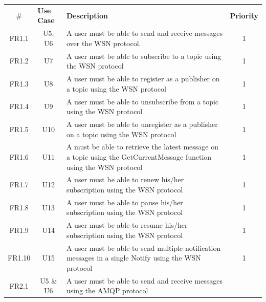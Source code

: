 \begin{longtable}{@{\extracolsep{\fill}}|l|l|p{8cm}|l|@{}}
\hline
\rowcolor{lightgray}
\multicolumn{4}{|c|}{\textbf{Functional requirements}}  \\ \hline
\multicolumn{1}{|c|}{\textbf{$\#$}} & \textbf{Use Case} & \textbf{Description}    & \textbf{Priority} \\ \hline
\multicolumn{1}{|c|}{FR1.1} & \multicolumn{1}{c|}{U5, U6} & A user must be able to send and receive messages over the WSN protocol. & 
\multicolumn{1}{c|}{1} \\ \hline
\multicolumn{1}{|c|}{FR1.2} & \multicolumn{1}{c|}{U7} & A user must be able to subscribe to a topic using the WSN protocol &
\multicolumn{1}{c|}{1} \\ \hline
\multicolumn{1}{|c|}{FR1.3} & \multicolumn{1}{c|}{U8} & A user must be able to register as a publisher on a topic using the WSN protocol &
\multicolumn{1}{c|}{1} \\ \hline
\multicolumn{1}{|c|}{FR1.4} & \multicolumn{1}{c|}{U9} & A user must be able to unsubscribe from a topic using the WSN protocol &
\multicolumn{1}{c|}{1} \\ \hline
\multicolumn{1}{|c|}{FR1.5} & \multicolumn{1}{c|}{U10} & A user must be able to unregister as a publisher on a topic using the WSN protocol &
\multicolumn{1}{c|}{1} \\ \hline
\multicolumn{1}{|c|}{FR1.6} & \multicolumn{1}{c|}{U11} & A must be able to retrieve the latest message on a topic using the GetCurrentMessage function using the WSN protocol &
\multicolumn{1}{c|}{1} \\ \hline
\multicolumn{1}{|c|}{FR1.7} & \multicolumn{1}{c|}{U12} & A user must be able to renew his/her subscription using the WSN protocol &
\multicolumn{1}{c|}{1} \\ \hline
\multicolumn{1}{|c|}{FR1.8} & \multicolumn{1}{c|}{U13} & A user must be able to pause his/her subscription using the WSN protocol &
\multicolumn{1}{c|}{1} \\ \hline
\multicolumn{1}{|c|}{FR1.9} & \multicolumn{1}{c|}{U14} & A user must be able to resume his/her subscription using the WSN protocol &
\multicolumn{1}{c|}{1} \\ \hline
\multicolumn{1}{|c|}{FR1.10} & \multicolumn{1}{c|}{U15} & A user must be able to send multiple notification messages in a single Notify using the WSN protocol &
\multicolumn{1}{c|}{1} \\ \hline
\multicolumn{1}{|c|}{FR2.1} & \multicolumn{1}{c|}{U5 \& U6} & A user must be able to send and receive messages using the AMQP protocol &

\end{longtable}
